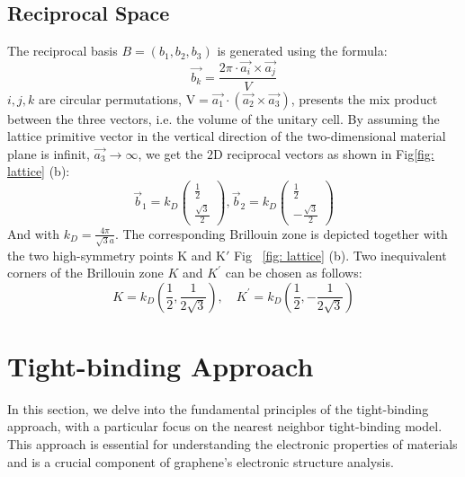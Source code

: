 \subsection{Reciprocal Space}
The reciprocal basis $B=\left(b_{1}, b_{2}, b_{3}\right)$ is generated using the formula:
$$
	\overrightarrow{b_{k}}=\frac{2 \pi \cdot \overrightarrow{a_{i}} \times \overrightarrow{a_{j}}}{V}
$$
$i, j, k$ are circular permutations, $\mathrm{V}=\overrightarrow{a_{1}}\cdot (\overrightarrow{a_{2}}
	\times \overrightarrow{a_3})$, presents the mix product between the three vectors, i.e. the volume
of the unitary cell.  By assuming the lattice primitive vector in the vertical direction of the
two-dimensional material plane is infinit, $\overrightarrow{a_{3}}\to\infty$, we get the $2 \mathrm{D}$ reciprocal vectors as shown in Fig\ref{fig: lattice} (b):
$$
	\vec b_{1}=k_{D}\left(\begin{array}{l}
			\frac{1}{2} \\
			\frac{\sqrt{3}}{2}
		\end{array}\right),
	\vec b_{2}=k_{D}\left(\begin{array}{c}
			\frac{1}{2} \\
			-\frac{\sqrt{3}}{2}
		\end{array}\right)
$$
And with $k_{D}=\frac{4 \pi}{\sqrt{3} a}$. The corresponding Brillouin zone is depicted together with the two high-symmetry points $\mathrm{K}$ and $\mathrm{K'}$ Fig ~\ref{fig: lattice} (b).
Two inequivalent corners of the Brillouin zone $K$ and $K^{\prime}$ can be chosen as follows:
$$
	K=k_{D}\left(\frac{1}{2}, \frac{1}{2 \sqrt{3}}\right), \quad K^{\prime}=k_{D}\left(\frac{1}{2},-\frac{1}{2 \sqrt{3}}\right)
$$

\section{Tight-binding Approach \label{sec:tightbinding}}

In this section, we delve into the fundamental principles of the tight-binding approach, with a particular focus on the nearest neighbor tight-binding model. This approach is essential for understanding the electronic properties of materials and is a crucial component of graphene's electronic structure analysis.

